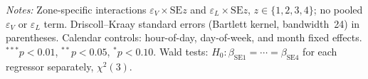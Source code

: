 \documentclass{article}
\begin{document}
\begin{table}[htbp]
\begin{threeparttable}
\begin{tablenotes}[flushleft]
\footnotesize
\item \textit{Notes:} Zone-specific interactions $\varepsilon_V \times \mathrm{SE}z$ and $\varepsilon_L \times \mathrm{SE}z$, $z \in \{1,2,3,4\}$; no pooled $\varepsilon_V$ or $\varepsilon_L$ term. Driscoll--Kraay standard errors (Bartlett kernel, bandwidth~24) in parentheses. Calendar controls: hour-of-day, day-of-week, and month fixed effects. $^{***}p<0.01$, $^{**}p<0.05$, $^{*}p<0.10$. Wald tests: $H_0\colon \beta_{\mathrm{SE1}}=\cdots=\beta_{\mathrm{SE4}}$ for each regressor separately, $\chi^2(3)$.
\end{tablenotes}
\end{threeparttable}
\end{table}
\end{document}
